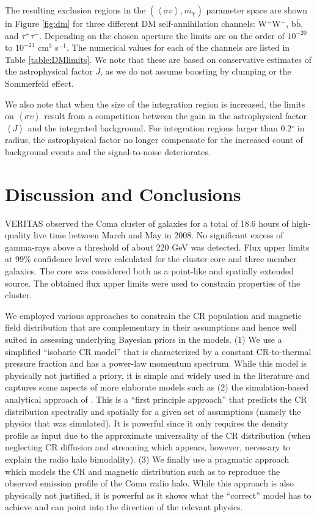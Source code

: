 \documentclass[12pt,manuscript]{aastex}
\newcommand{\expval}[1]{\left\langle #1 \right\rangle}
\begin{document}
The resulting exclusion regions in the $(\expval{\sigma v}, m_{\chi})$ parameter space are shown in
Figure \ref{fig:dm} for three different DM self-annihilation channels: W$^{+}$W$^{-}$,
b$\bar{\mathrm{b}}$, and $\tau^{+}\tau^{-}$. Depending on the chosen aperture the limits are on
the order of $10^{-20}$ to $10^{-21}$ cm$^{3}$ s$^{-1}$. The numerical values for each of the channels
are listed in Table \ref{table:DMlimits}. We note that these are based on conservative estimates of the
astrophysical factor $J$, as we do not assume boosting by clumping or the Sommerfeld effect.

We also note that when the size of the integration region is increased, the limits on $\expval{\sigma v}$
result from a competition between the gain in the astrophysical factor $\expval{J}$ and the integrated
background. For integration regions larger than 0.2$^{\circ}$ in radius, the astrophysical factor
no longer compensate for the increased count of background events and the signal-to-noise
deteriorates. 



%
%

\section{Discussion and Conclusions}
VERITAS observed the Coma cluster of galaxies for a total of 18.6 hours of high-quality live time
between March and May in 2008. No significant excess of gamma-rays above a threshold of about 220
GeV was detected. Flux upper limits at 99\% confidence level were calculated for the cluster core
and three member galaxies. The core was considered both as a point-like and spatially extended
source. The obtained flux upper limits were used to constrain properties of the cluster.

We employed various approaches to constrain the CR population and magnetic field distribution that
are complementary in their assumptions and hence well suited in assessing underlying Bayesian
priors in the models. (1) We use a simplified ``isobaric CR model'' that is characterized by a
constant CR-to-thermal pressure fraction and has a power-law momentum spectrum.  While this model
is physically not justified a priory, it is simple and widely used in the literature and captures
some aspects of more elaborate models such as (2) the simulation-based analytical approach of
\citet{article:PinzkePfrommer:2010}. This is a ``first principle approach'' that predicts the CR
distribution spectrally and spatially for a given set of assumptions (namely the physics that was
simulated). It is powerful since it only requires the density profile as input due to the
approximate universality of the CR distribution (when neglecting CR diffusion and streaming which
appears, however, necessary to explain the radio halo bimodality). (3) We finally use a pragmatic
approach which models the CR and magnetic distribution such as to reproduce the observed emission
profile of the Coma radio halo. While this approach is also physically not justified, it is
powerful as it shows what the ``correct'' model has to achieve and can point into the direction of
the relevant physics.
\end{document}
